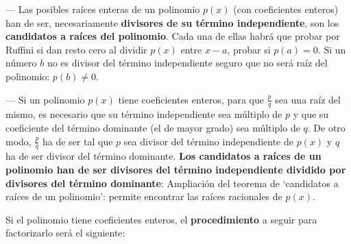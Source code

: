 --- Las posibles raíces enteras de un polinomio $p(x)$ (con coeficientes enteros) han de ser, necesariamente \textbf{divisores de su término independiente}, son los \textbf{candidatos a raíces del polinomio}. Cada una de ellas habrá que probar por Ruffini si dan resto cero al dividir $p(x)$ entre $x-a$, probar si $p(a)=0$. Si un número $b$ no es divisor del término independiente seguro que no será raíz del polinomio: $p(b)\neq 0$.

\vspace{2mm}\textcolor{gris}{--- Si un polinomio $p(x)$ tiene coeficientes enteros, para que $\frac p q $ sea una raíz del mismo, es necesario que su término independiente sea múltiplo de $p$ y que su coeficiente del término dominante (el de mayor grado) sea múltiplo de $q$. De otro modo, $\frac p q$ ha de ser tal que $p$ sea divisor del término independiente de $p(x)$ y $q$ ha de ser divisor del término dominante. \textbf{Los  candidatos a raíces de un polinomio han de ser divisores del término independiente dividido por divisores del término dominante}: \textsf{Ampliación del teorema de `candidatos a raíces de un polinomio': permite encontrar las raíces racionales de $p(x)$.}}

\vspace{5mm}
Si el polinomio tiene coeficientes enteros, el \textbf{procedimiento} a seguir para factorizarlo será el siguiente:

